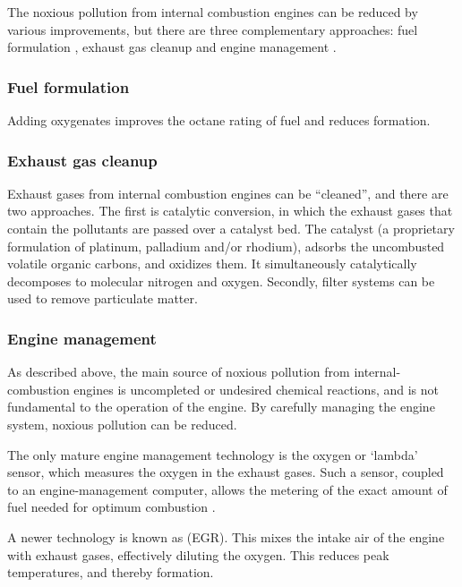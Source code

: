 The noxious pollution from internal combustion engines can be reduced by various
improvements, but there are three complementary approaches: fuel formulation
\autocite{Gertler1999}, exhaust gas cleanup \autocite{Braun2018} and engine
management \autocite{Reif2015}.

\subsubsection{Fuel formulation}

Adding oxygenates improves the octane rating of fuel and reduces \nox formation. 

\subsubsection{Exhaust gas cleanup} \label{par:cleanup}

Exhaust gases from internal combustion engines can be ``cleaned'', and there are
two approaches. The first is catalytic conversion, in which the exhaust gases
that contain the pollutants are passed over a catalyst bed. The catalyst (a
proprietary formulation of platinum, palladium and/or rhodium), adsorbs the
uncombusted volatile organic carbons, and oxidizes them. It simultaneously
catalytically decomposes \nox to molecular nitrogen and oxygen. Secondly, filter
systems can be used to remove particulate matter.

\subsubsection{Engine management} \label{par:engine-management}

As described above, the main source of noxious pollution from
internal\hyp{}combustion engines is uncompleted or undesired chemical reactions,
and is not fundamental to the operation of the engine. By carefully managing the
engine system, noxious pollution can be reduced. 

The only mature engine management technology is the oxygen or `lambda' sensor,
which measures the oxygen in the exhaust gases. Such a sensor, coupled to an
engine-management computer, allows the me\-ter\-ing of the exact amount of fuel
need\-ed for op\-ti\-mum combustion \autocite{Frauhammer2014}.

A newer technology is known as  (EGR). This
mixes the intake air of the engine with exhaust gases, effectively diluting the
oxygen. This reduces peak temperatures, and thereby \nox formation.

